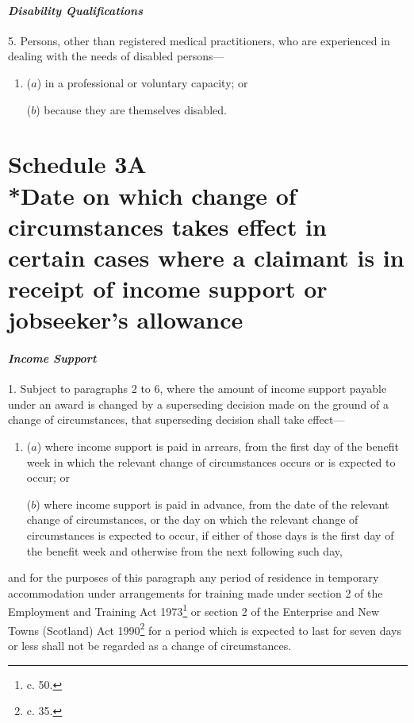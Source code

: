 \documentclass[12pt,a4paper]{article}
\begin{document}

\subsection*{\itshape Disability Qualifications}

5.  Persons, other than registered medical practitioners, who are experienced in dealing with the needs of disabled persons—
\begin{enumerate}\item[]
($a$) in a professional or voluntary capacity; or

($b$) because they are themselves disabled.
\end{enumerate}

\part[Schedule 3A --- Date on which change of circumstances takes effect in certain cases where a claimant is in receipt of income support or jobseeker’s allowance]{Schedule 3A\\*Date on which change of circumstances takes effect in certain cases where a claimant is in receipt of income support or jobseeker’s allowance}

\renewcommand\parthead{--- Schedule 3A}

\subsection*{\itshape Income Support}

1.  Subject to paragraphs 2 to 6, where the amount of income support payable under an award is changed by a superseding decision made on the ground of a change of circumstances, that superseding decision shall take effect—
\begin{enumerate}\item[]
($a$) where income support is paid in arrears, from the first day of the benefit week in which the relevant change of circumstances occurs or is expected to occur; or

($b$) where income support is paid in advance, from the date of the relevant change of circumstances, or the day on which the relevant change of circumstances is expected to occur, if either of those days is the first day of the benefit week and otherwise from the next following such day,
\end{enumerate}
and for the purposes of this paragraph any period of residence in temporary accommodation under arrangements for training made under section 2 of the Employment and Training Act 1973\footnote{ c. 50.} or section 2 of the Enterprise and New Towns (Scotland) Act 1990\footnote{ c. 35.} for a period which is expected to last for seven days or less shall not be regarded as a change of circumstances.
\end{document}

